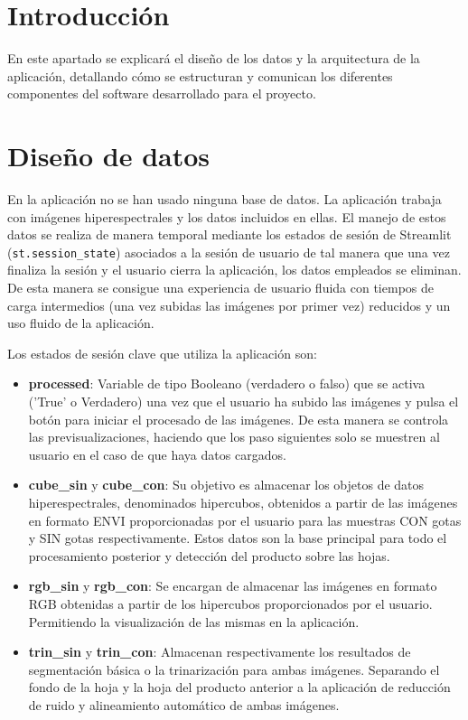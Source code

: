 \label{apendice:diseno}

\section{Introducción}
En este apartado se explicará el diseño de los datos y la arquitectura de la aplicación, detallando cómo se estructuran y comunican los diferentes componentes del software desarrollado para el proyecto.

\section{Diseño de datos}
En la aplicación no se han usado ninguna base de datos. La aplicación trabaja con imágenes hiperespectrales y los datos incluidos en ellas. El manejo de estos datos se realiza de manera temporal mediante los estados de sesión de Streamlit (\verb|st.session_state|) asociados a la sesión de usuario de tal manera que una vez finaliza la sesión y el usuario cierra la aplicación,  los datos empleados se eliminan. De esta manera se consigue una experiencia de usuario fluida con tiempos de carga intermedios (una vez subidas las imágenes por primer vez) reducidos y un uso fluido de la aplicación.

Los estados de sesión clave que utiliza la aplicación son:
\begin{itemize}
    \item \textbf{processed}: Variable de tipo Booleano (verdadero o falso) que se activa ('True' o Verdadero) una vez que el usuario ha subido las imágenes y pulsa el botón para iniciar el procesado de las imágenes. De esta manera se controla las previsualizaciones, haciendo que los paso siguientes solo se muestren al usuario en el caso de que haya datos cargados.
    \item \textbf{cube\_sin} y \textbf{cube\_con}: Su objetivo es almacenar los objetos de datos hiperespectrales, denominados hipercubos, obtenidos a partir de las imágenes en formato ENVI proporcionadas por el usuario para las muestras CON gotas y SIN gotas respectivamente. Estos datos son la base principal para todo el procesamiento posterior y detección del producto sobre las hojas.
    \item \textbf{rgb\_sin} y \textbf{rgb\_con}: Se encargan de almacenar las imágenes en formato RGB obtenidas a partir de los hipercubos proporcionados por el usuario. Permitiendo la visualización de las mismas en la aplicación.
    \item \textbf{trin\_sin} y \textbf{trin\_con}: Almacenan respectivamente los resultados de segmentación básica o la trinarización para ambas imágenes. Separando el fondo de la hoja y la hoja del producto anterior a la aplicación de reducción de ruido y alineamiento automático de ambas imágenes.
\end{itemize}

